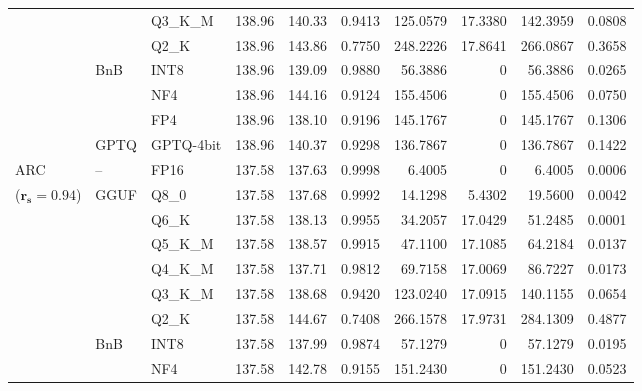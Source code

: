 \begin{longtable}{ll l rrrrrrr}
 &  & Q3\_K\_M & 138.96 & 140.33 & \cellcolor{red!18} 0.9413 & \cellcolor{red!18} 125.0579 & 17.3380 & \cellcolor{red!18} 142.3959 & \cellcolor{red!18} 0.0808 \\
 &  & Q2\_K & 138.96 & 143.86 & \cellcolor{red!35} 0.7750 & \cellcolor{red!35} 248.2226 & 17.8641 & \cellcolor{red!35} 266.0867 & \cellcolor{red!35} 0.3658 \\
 & BnB & INT8 & 138.96 & 139.09 & 0.9880 & 56.3886 & \cellcolor{cyan!12} $0$ & 56.3886 & 0.0265 \\
 &  & NF4 & 138.96 & 144.16 & \cellcolor{red!18} 0.9124 & \cellcolor{red!18} 155.4506 & \cellcolor{cyan!12} $0$ & \cellcolor{red!18} 155.4506 & \cellcolor{red!18} 0.0750 \\
 &  & FP4 & 138.96 & 138.10 & \cellcolor{red!18} 0.9196 & \cellcolor{red!18} 145.1767 & \cellcolor{cyan!12} $0$ & \cellcolor{red!18} 145.1767 & \cellcolor{red!18} 0.1306 \\
 & GPTQ & GPTQ-4bit & 138.96 & 140.37 & \cellcolor{red!18} 0.9298 & \cellcolor{red!18} 136.7867 & \cellcolor{cyan!12} $0$ & \cellcolor{red!18} 136.7867 & \cellcolor{red!18} 0.1422 \\
\midrule
ARC & -- & FP16 & 137.58 & 137.63 & 0.9998 & 6.4005 & \cellcolor{cyan!12} $0$ & 6.4005 & 0.0006 \\
{\small ($\mathbf{r_s{=}0.94}$)} & GGUF & Q8\_0 & 137.58 & 137.68 & 0.9992 & 14.1298 & 5.4302 & 19.5600 & 0.0042 \\
 &  & Q6\_K & 137.58 & 138.13 & 0.9955 & 34.2057 & 17.0429 & 51.2485 & 0.0001 \\
 &  & Q5\_K\_M & 137.58 & 138.57 & 0.9915 & 47.1100 & 17.1085 & 64.2184 & 0.0137 \\
 &  & Q4\_K\_M & 137.58 & 137.71 & 0.9812 & 69.7158 & 17.0069 & 86.7227 & 0.0173 \\
 &  & Q3\_K\_M & 137.58 & 138.68 & \cellcolor{red!18} 0.9420 & \cellcolor{red!18} 123.0240 & 17.0915 & \cellcolor{red!18} 140.1155 & \cellcolor{red!18} 0.0654 \\
 &  & Q2\_K & 137.58 & 144.67 & \cellcolor{red!35} 0.7408 & \cellcolor{red!35} 266.1578 & 17.9731 & \cellcolor{red!35} 284.1309 & \cellcolor{red!35} 0.4877 \\
 & BnB & INT8 & 137.58 & 137.99 & 0.9874 & 57.1279 & \cellcolor{cyan!12} $0$ & 57.1279 & 0.0195 \\
 &  & NF4 & 137.58 & 142.78 & \cellcolor{red!18} 0.9155 & \cellcolor{red!18} 151.2430 & \cellcolor{cyan!12} $0$ & \cellcolor{red!18} 151.2430 & \cellcolor{red!18} 0.0523 \\

\end{longtable}
